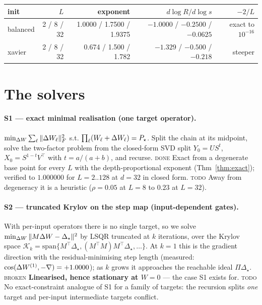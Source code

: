 \documentclass{article}
\newcommand{\OK}{{\color{green!50!black}\textsc{done}}}
\newcommand{\TD}{{\color{orange!85!black}\textsc{todo}}}
\newcommand{\NO}{{\color{red!75!black}\textsc{broken}}}
\theoremstyle{plain}\newtheorem{theorem}{Theorem}\newtheorem{lemma}[theorem]{Lemma}
\theoremstyle{definition}\newtheorem{definition}[theorem]{Definition}
\newcommand{\Dstar}{\Delta_\star}\newcommand{\Lam}{\Lambda}
\begin{document}
\begin{center}\small
\begin{tabular}{lrrrr}
\toprule
init & $L$ & exponent & $d\log R/d\log s$ & $-2/L$ \\
\midrule
balanced & 2 / 8 / 32 & 1.0000 / 1.7500 / 1.9375 & $-1.0000$ / $-0.2500$ / $-0.0625$ & exact to $10^{-16}$ \\
xavier   & 2 / 8 / 32 & 0.674 / 1.500 / 1.782 & $-1.329$ / $-0.500$ / $-0.218$ & steeper \\
\bottomrule
\end{tabular}
\end{center}

\section{The solvers}\label{sec:solver}

\paragraph{S1 --- exact minimal realisation (one target operator).}
$\min_{\Delta W}\sum_\ell\|\Delta W_\ell\|_F^2$ s.t. $\prod_\ell(W_\ell+\Delta W_\ell)=P_\star$. Split the chain
at its midpoint, solve the two-factor problem from the closed-form SVD split $Y_0=US^t$,
$X_0=S^{1-t}V^\top$ with $t=a/(a+b)$, and recurse. \OK{} Exact from a degenerate base point for
every $L$ with the depth-proportional exponent (Thm~\ref{thm:exact}); verified to $1.000000$ for
$L=2..128$ at $d{=}32$ in closed form. \TD{} Away from degeneracy it is a heuristic
($\rho=0.05$ at $L{=}8$ to $0.23$ at $L{=}32$).

\paragraph{S2 --- truncated Krylov on the step map (input-dependent gates).}
With per-input operators there is no single target, so we solve
$\min_{\dW}\|M\dW-\Dstar\|^2$ by LSQR truncated at $k$ iterations, over the Krylov space
$\mathcal K_k=\mathrm{span}\{M^\top\Dstar,(M^\top M)M^\top\Dstar,\dots\}$. At $k=1$ this is the
gradient direction with the residual-minimising step length (measured:
$\cos(\Delta W^{(1)},-\nabla)=+1.0000$); as $k$ grows it approaches the reachable ideal $\Pi\Dstar$.
\NO{} \textbf{Linearised, hence stationary at $W=0$} --- the case S1 exists for.
\TD{} No exact-constraint analogue of S1 for a family of targets: the recursion splits \emph{one}
target and per-input intermediate targets conflict.
\end{document}
